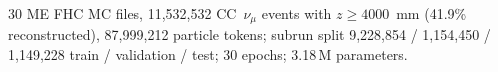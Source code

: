 30 ME FHC MC files, 11{,}532{,}532 CC~$\nu_\mu$ events with $z \ge 4000$~mm (41.9\% reconstructed), 87{,}999{,}212 particle tokens; subrun split 9{,}228{,}854 / 1{,}154{,}450 / 1{,}149{,}228 train / validation / test; 30 epochs; 3.18\,M parameters.
